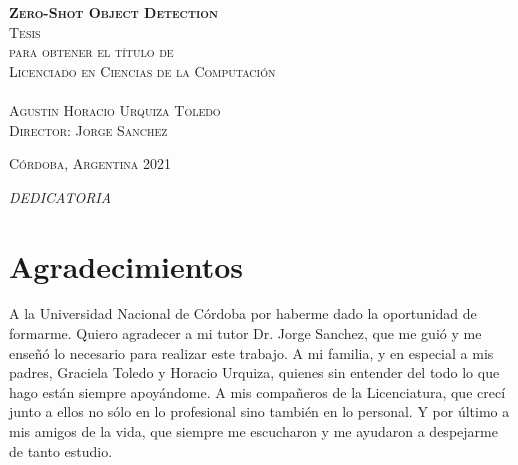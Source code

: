 \documentclass[12pt,twosided]{book}
\begin{document}
\begin{titlepage}
\begin{center}
\vspace{1em}

\textsc{\huge \textbf{Zero-Shot Object Detection}}\\[2em]

\textsc{\large Tesis}\\[1em]

\textsc{ para obtener el título de}\\[1em]

\textsc{Licenciado en Ciencias de la Computación}\\[1em]

\textsc{}\\[1em]

\textsc{\Large Agustin Horacio Urquiza Toledo}\\[1em]

\textsc{\large Director: Jorge Sanchez}

\end{center}

\vspace*{\fill}
\textsc{Córdoba, Argentina \hspace*{\fill} 2021}

\end{titlepage}

\pagestyle{empty}
\frontmatter

\begin{flushright}
\textit{DEDICATORIA}
\end{flushright}


\chapter*{Agradecimientos}
A la Universidad Nacional de Córdoba por haberme dado la
oportunidad de formarme. Quiero agradecer a mi tutor Dr. Jorge Sanchez, que me guió y me enseñó lo necesario para realizar este trabajo. A mi familia, y en especial a mis padres, Graciela Toledo y Horacio Urquiza, quienes sin entender del todo lo que hago están siempre apoyándome. A mis compañeros de la Licenciatura, que crecí junto a ellos no sólo en lo profesional sino también en lo personal. Y por último a mis amigos de la vida, que siempre me escucharon y me ayudaron a despejarme de tanto estudio.
\end{document}

